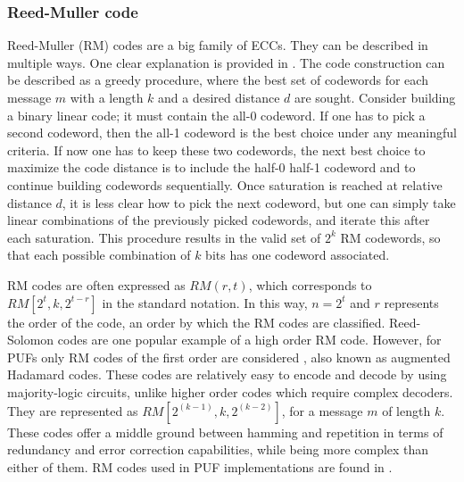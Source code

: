 \subsubsection{Reed-Muller code}

Reed-Muller (RM) codes are a big family of ECCs. They can be described in multiple ways. One clear explanation is provided in \cite{Abbe2020}. The code construction can be described as a greedy procedure, where the best set of codewords for each message $m$ with a length $k$ and a desired distance $d$ are sought. Consider building a binary linear code; it must contain the all-0 codeword. If one has to pick a second codeword, then the all-1 codeword is the best choice under any meaningful criteria. If now one has to keep these two codewords, the next best choice to maximize the code distance is to include the half-0 half-1 codeword and to continue building codewords sequentially. Once saturation is reached at relative distance $d$, it is less clear how to pick the next codeword, but one can simply take linear combinations of the previously picked codewords, and iterate this after each saturation. This procedure results in the valid set of $2^k$ RM codewords, so that each possible combination of $k$ bits has one codeword associated. 




RM codes are often expressed as $RM(r,t)$, which corresponds to $RM\left[2^{t}, k, 2^{t-r}\right]$ in the standard notation. In this way, $n=2^t$ and $r$ represents the order of the code, an order by which the RM codes are classified. Reed-Solomon codes are one popular example of a high order RM code. However, for PUFs only RM codes of the first order are considered \cite{Bosch2008}, also known as augmented Hadamard codes. These codes are relatively easy to encode and decode by using majority-logic circuits, unlike higher order codes which require complex decoders. They are represented as $RM[2^{(k-1)},k,2^{(k-2)}]$, for a message $m$ of length $k$. These codes offer a middle ground between hamming and repetition in terms of redundancy and error correction capabilities, while being more complex than either of them. RM codes used in PUF implementations are found in \cite{Bosch2008,VanDerLeest2012soft,Hiller2015}. 



